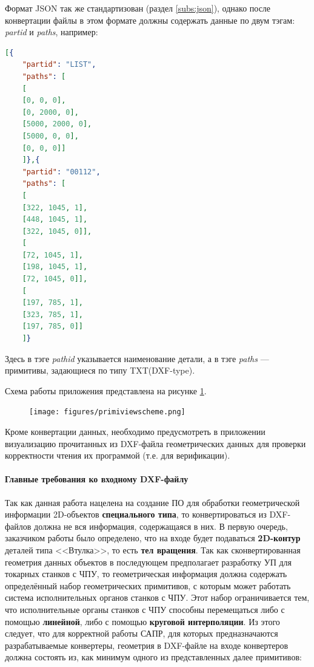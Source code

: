 Формат JSON так же стандартизован (раздел \ref{subs:json}), однако после конвертации файлы в этом формате должны содержать данные по двум тэгам: \textit{partid} и \textit{paths}, например:
\begin{lstlisting}[language=json,label=list:dxftxtscheme]
[{
	"partid": "LIST",
	"paths": [
	[
	[0, 0, 0],
	[0, 2000, 0],
	[5000, 2000, 0],
	[5000, 0, 0],
	[0, 0, 0]]
	]},{
	"partid": "00112",
	"paths": [
	[
	[322, 1045, 1],
	[448, 1045, 1],
	[322, 1045, 0]],
	[
	[72, 1045, 1],
	[198, 1045, 1],
	[72, 1045, 0]],
	[
	[197, 785, 1],
	[323, 785, 1],
	[197, 785, 0]]
	]}
\end{lstlisting}

Здесь в тэге \textit{pathid} указывается наименование детали, а в тэге \textit{paths} --- примитивы, задающиеся по типу TXT(DXF-type).

Схема работы приложения представлена на рисунке \ref{fig:primiviewscheme}.

\begin{figure}[H]
	\centering
	\texttt{[image: figures/primiviewscheme.png]}
	\label{fig:primiviewscheme}
\end{figure}

Кроме конвертации данных, необходимо предусмотреть в приложении визуализацию прочитанных из DXF-файла геометрических данных для проверки корректности чтения их программой (т.е. для верификации).

\paragraph{Главные требования ко входному DXF-файлу}

Так как данная работа нацелена на создание ПО для обработки геометрической информации 2D-объектов \textbf{специального типа}, то конвертироваться из DXF-файлов должна не вся информация, содержащаяся в них. В первую очередь, заказчиком работы было определено, что на входе будет подаваться \textbf{2D-контур} деталей типа <<Втулка>>, то есть \textbf{тел вращения}. Так как сконвертированная геометрия данных объектов в последующем предполагает разработку УП для токарных станков с ЧПУ, то геометрическая информация должна содержать определённый набор геометрических примитивов, с которым может работать система исполнительных органов станков с ЧПУ. Этот набор ограничивается тем, что исполнительные органы станков с ЧПУ способны перемещаться либо с помощью \textbf{линейной}, либо с помощью \textbf{круговой интерполяции}. Из этого следует, что для корректной работы САПР, для которых предназначаются разрабатываемые конвертеры, геометрия в DXF-файле на входе конвертеров должна состоять из, как минимум одного из представленных далее примитивов:

